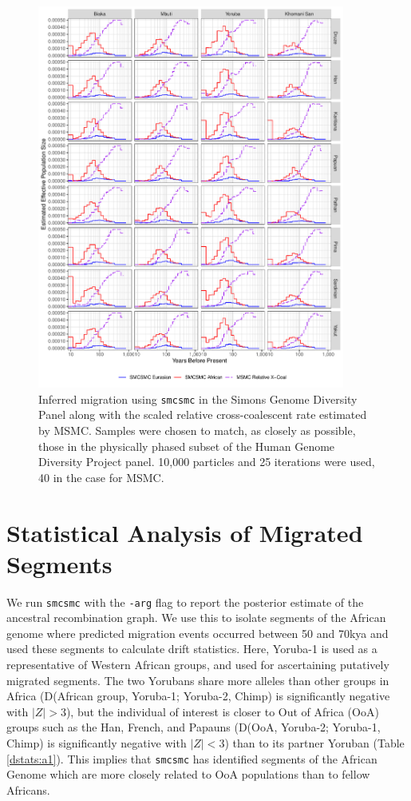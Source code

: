 \documentclass{article}
\begin{document}
\begin{figure}
	\centering
	\includegraphics[width=0.9\textwidth]{../plot/sgdp_subet_mig.pdf}
	\caption{Inferred migration using {\tt smcsmc} in the Simons Genome Diversity Panel along with the scaled relative cross-coalescent rate estimated by MSMC. Samples were chosen to match, as closely as possible, those in the physically phased subset of the Human Genome Diversity Project panel. 10,000 particles and 25 iterations were used, 40 in the case for MSMC.}
	\label{fig:hgdp_sgdp_mig}
\end{figure}

\clearpage
\section{Statistical Analysis of Migrated Segments} \label{dstats_section}

We run {\tt smcsmc} with the {\tt -arg} flag to report the posterior estimate of the ancestral recombination graph. We use this to isolate segments of the African genome where predicted migration events occurred between 50 and 70kya and used these segments to calculate drift statistics. Here, Yoruba-1 is used as a representative of Western African groups, and used for ascertaining putatively migrated segments. The two Yorubans share more alleles than other groups in Africa (D(African group, Yoruba-1; Yoruba-2, Chimp) is significantly negative with $|Z|>3$), but the individual of interest is closer to Out of Africa (OoA) groups such as the Han, French, and Papauns (D(OoA, Yoruba-2; Yoruba-1, Chimp) is significantly negative with $|Z|<3$) than to its partner Yoruban (Table \ref{dstats:a1}). This implies that {\tt smcsmc} has identified segments of the African Genome which are more closely related to OoA populations than to fellow Africans.   
\end{document}
